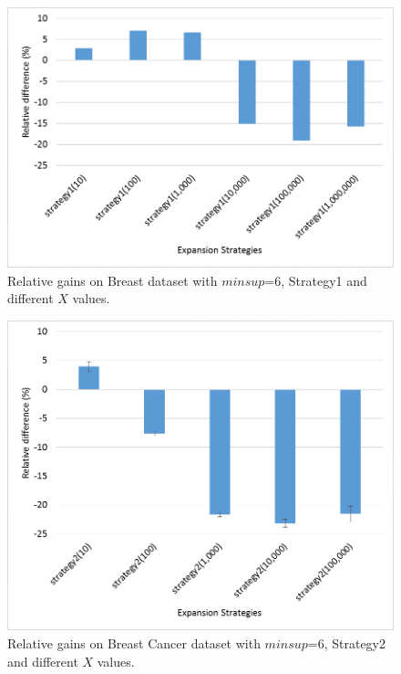 \begin{figure}[!t]
\includegraphics[width=5in]{immagini_extension/breast_strategy1.png}
\caption{Relative gains on Breast dataset with $minsup$=6, Strategy1 and different $X$ values.
}
\label{breast_strategy1}
\end{figure}

\begin{figure}[!t]
\includegraphics[width=5in]{immagini_extension/breast_strategy2.png}
\caption{Relative gains on Breast Cancer dataset with $minsup$=6, Strategy2 and different $X$ values.
}
\label{breast_strategy2}
\end{figure}

